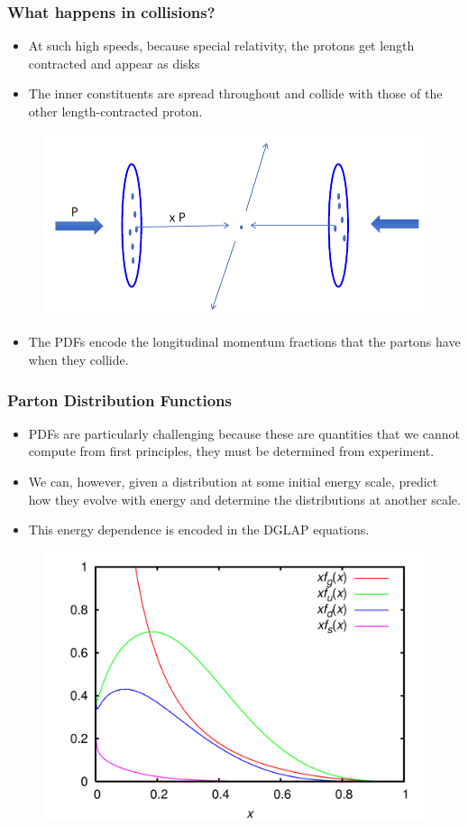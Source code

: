 \documentclass{beamer}
\begin{document}
\begin{frame}
  \frametitle{What happens in collisions?}

  \begin{itemize}
  \item At such high speeds, because special relativity, the protons get length contracted and appear as disks
  \item The inner constituents are spread throughout and collide with those of the other length-contracted proton.
  \end{itemize}

  \begin{figure}
    \centering
    \includegraphics[width=0.6\linewidth]{./gfx/colliding-protons.png}
  \end{figure}

  \begin{itemize}
  \item The PDFs encode the longitudinal momentum fractions that the partons have when they collide.
  \end{itemize}
\end{frame}



\begin{frame}
\frametitle{Parton Distribution Functions}

\begin{itemize}
\item PDFs are particularly challenging because these are quantities that we cannot compute from first principles, they must be determined from experiment.
\item We can, however, given a distribution at some initial energy scale, predict how they evolve with energy and determine the distributions at another scale.
\item This energy dependence is encoded in the DGLAP equations.
\end{itemize}

\begin{figure}
  \centering
  \includegraphics[width=0.4\linewidth]{./gfx/pdfs.png}
\end{figure}

\end{frame}
\end{document}
